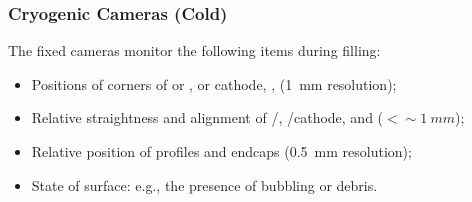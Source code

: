 
\subsubsection{Cryogenic Cameras (Cold)}

The fixed cameras
monitor the following items during filling:
\begin{itemize}
\item Positions of corners of  or ,  or cathode, ,  (\SI{1}{mm} resolution);
\item Relative straightness and alignment of /, /cathode, and  (\(<\sim\SI{1}{mm}\));
\item Relative position of profiles and endcaps (\SI{0.5}{mm} resolution);
\item State of \lar surface: e.g., the presence of bubbling or debris.
\end{itemize}




